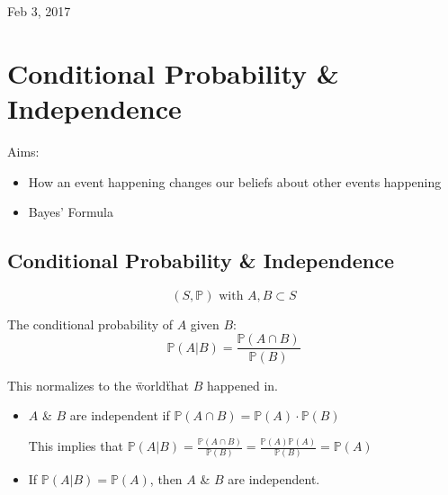\documentclass[main.tex]{subfiles}
\begin{document}
\hrulefill{}

Feb 3, 2017

\vspace{3mm}

\section{Conditional Probability \& Independence}

Aims:

\begin{itemize}
    \item How an event happening changes our beliefs about other events happening
    \item Bayes' Formula
\end{itemize}

\subsection{Conditional Probability \& Independence}
$$(S, \mathbb{P})\textrm{ with } A, B \subset S$$

The conditional probability of $A$ given $B$:
\begin{equation}
\label{eq:conditional-probability}
\mathbb{P}(A | B) = \frac{\mathbb{P}(A\cap B)}{\mathbb{P}(B)}
\end{equation}

This normalizes to the \"world\" that $B$ happened in.

\begin{itemize}
    \item $A$ \& $B$ are independent if $\mathbb{P}(A\cap B) = \mathbb{P}(A)\cdot\mathbb{P}(B)$
    
    This implies that $\mathbb{P}(A | B) = \frac{\mathbb{P}(A\cap B)}{\mathbb{P}(B)} = \frac{\mathbb{P}(A)\mathbb{P}(A)}{\mathbb{P}(B)} = \mathbb{P}(A)$

    \item If $\mathbb{P}(A | B) = \mathbb{P}(A)$, then $A$ \& $B$ are independent.
\end{itemize}
\end{document}
